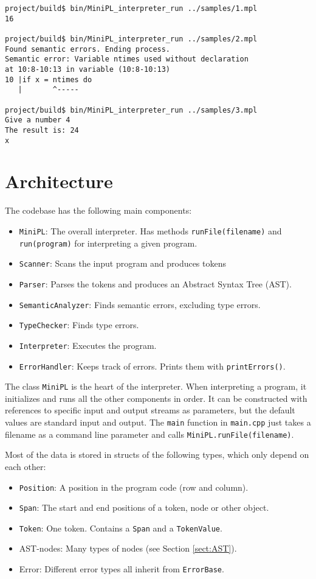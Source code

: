 \documentclass[a4paper]{article}
\newcommand*{\code}[1]{\texttt{#1}}
\begin{document}
\begin{verbatim}
project/build$ bin/MiniPL_interpreter_run ../samples/1.mpl
16

project/build$ bin/MiniPL_interpreter_run ../samples/2.mpl
Found semantic errors. Ending process.
Semantic error: Variable ntimes used without declaration 
at 10:8-10:13 in variable (10:8-10:13)
10 |if x = ntimes do
   |       ^-----

project/build$ bin/MiniPL_interpreter_run ../samples/3.mpl
Give a number 4
The result is: 24
x
\end{verbatim}

\clearpage
\section{Architecture}


The codebase has the following main components:

\begin{itemize}
  \item \code{MiniPL}: The overall interpreter. Has methods 
        \code{runFile(filename)} and \code{run(program)} for 
        interpreting a given program.
  \item \code{Scanner}:  
        Scans the input program and produces tokens
  \item \code{Parser}:
        Parses the tokens and produces an Abstract Syntax Tree (AST).
  \item \code{SemanticAnalyzer}: Finds semantic
        errors, excluding type errors.
  \item \code{TypeChecker}: Finds type errors.
  \item \code{Interpreter}: Executes the program.
  \item \code{ErrorHandler}: Keeps track of errors. Prints them with
  \code{printErrors()}.
\end{itemize}
The class \code{MiniPL} is the heart of the interpreter. When 
interpreting a program, it initializes 
and runs all the other components in order. It can be constructed 
with references to specific input and output streams as parameters, 
but the default values are standard input and output. 
The \code{main} function in \code{main.cpp} just takes a 
filename as a command line parameter and calls 
\code{MiniPL.runFile(filename)}. 

Most of the data is stored in structs of the following types, 
which only depend on each other:
\begin{itemize}
  \item \code{Position}: A position in the program code (row and column).
  \item \code{Span}: The start and end positions of a token, node or other object.
  \item \code{Token}: One token. Contains a \code{Span} and 
  a \code{TokenValue}.
  \item AST-nodes: Many types of nodes 
        (see Section \ref{sect:AST}).
  \item Error: Different 
  error types all inherit from \code{ErrorBase}.
\end{itemize}
\end{document}
